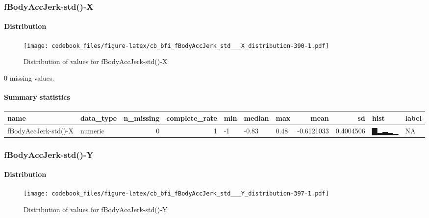 \documentclass[
]{article}
\begin{document}
\hypertarget{fBodyAccJerk_std___X}{%
\subsubsection{fBodyAccJerk-std()-X}\label{fBodyAccJerk_std___X}}

\hypertarget{fBodyAccJerk_std___X_distribution}{%
\paragraph{Distribution}\label{fBodyAccJerk_std___X_distribution}}

\begin{figure}
\centering
\texttt{[image: codebook\_files/figure-latex/cb\_bfi\_fBodyAccJerk\_std\_\_\_X\_distribution-390-1.pdf]}
\caption{Distribution of values for fBodyAccJerk-std()-X}
\end{figure}

0 missing values.

\hypertarget{fBodyAccJerk_std___X_summary}{%
\paragraph{Summary statistics}\label{fBodyAccJerk_std___X_summary}}

\begin{longtable}[]{@{}llrrlllrrll@{}}
\toprule
name & data\_type & n\_missing & complete\_rate & min & median & max &
mean & sd & hist & label \\
\midrule
\endhead
fBodyAccJerk-std()-X & numeric & 0 & 1 & -1 & -0.83 & 0.48 & -0.6121033
& 0.4004506 & ▇▂▃▂▁ & NA \\
\bottomrule
\end{longtable}

\hypertarget{fBodyAccJerk_std___Y}{%
\subsubsection{fBodyAccJerk-std()-Y}\label{fBodyAccJerk_std___Y}}

\hypertarget{fBodyAccJerk_std___Y_distribution}{%
\paragraph{Distribution}\label{fBodyAccJerk_std___Y_distribution}}

\begin{figure}
\centering
\texttt{[image: codebook\_files/figure-latex/cb\_bfi\_fBodyAccJerk\_std\_\_\_Y\_distribution-397-1.pdf]}
\caption{Distribution of values for fBodyAccJerk-std()-Y}
\end{figure}
\end{document}
